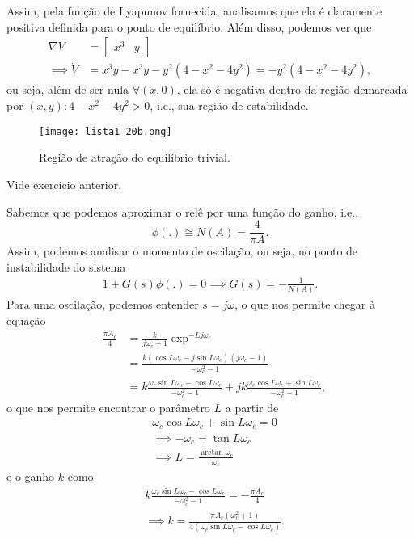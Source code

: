 \documentclass[a4paper]{report}
\begin{document}
Assim, pela função de Lyapunov fornecida, analisamos que ela é claramente positiva definida para o ponto de equilíbrio. Além disso, podemos ver que
\begin{align*}
    \nabla V &= \begin{bmatrix} x^3 & y \end{bmatrix} \\
    \implies \dot{V} &= x^3y -x^3y -y^2\left( 4-x^2-4y^2 \right) =-y^2\left( 4-x^2-4y^2 \right)
,\end{align*}
ou seja, além de ser nula $\forall \left( x,0 \right) $, ela só é negativa dentro da região demarcada por $\left( x,y \right) : 4-x^2-4y^2 > 0$, i.e., sua região de estabilidade.


\begin{figure}[H]
    \centering
    \texttt{[image: lista1\_20b.png]}
    \caption{Região de atração do equilíbrio trivial.}
    \label{fig:lista1_20b-png}
\end{figure}


Vide exercício anterior.


Sabemos que podemos aproximar o relê por uma função do ganho, i.e., \[
    \phi\left( . \right) \cong N(A) = \frac{4}{\pi A}
.\] Assim, podemos analisar o momento de oscilação, ou seja, no ponto de instabilidade do sistema
\begin{align*}
    1+G(s)\phi(.) = 0 \implies G(s) = -\frac{1}{N(A)}
.\end{align*}
Para uma oscilação, podemos entender $s=j\omega$, o que nos permite chegar à equação
\begin{align*}
    -\frac{\pi A_c}{4} &=\frac{k}{j\omega_c + 1}\exp^{-Lj\omega_c}\\
		       &= \frac{k\left( \cos L\omega_c -j\sin L\omega_c \right) \left( j\omega_c -1 \right) }{-\omega_c^2 -1} \\
		       &= k\frac{\omega_c\sin L\omega_c -\cos L\omega_c}{-\omega_c^2 -1} +jk\frac{\omega_c \cos L\omega_c + \sin L\omega_c}{-\omega_c^2 -1}
,\end{align*}
o que nos permite encontrar o parâmetro $L$ a partir de
\begin{align*}
    &\omega_c \cos L\omega_c + \sin L\omega_c = 0 \\
    &\implies -\omega_c = \tan L\omega_c \\
    &\implies L = \frac{\arctan \omega_c}{\omega_c}
\end{align*}
e o ganho $k$ como
\begin{align*}
    &k\frac{\omega_c\sin L\omega_c -\cos L\omega_c}{-\omega_c^2 -1} = -\frac{\pi A_c}{4} \\
    &\implies k = \frac{\pi A_c \left( \omega_c^2 +1 \right) }{4\left( \omega_c\sin L\omega_c -\cos L\omega_c \right) }
.\end{align*}
\end{document}
